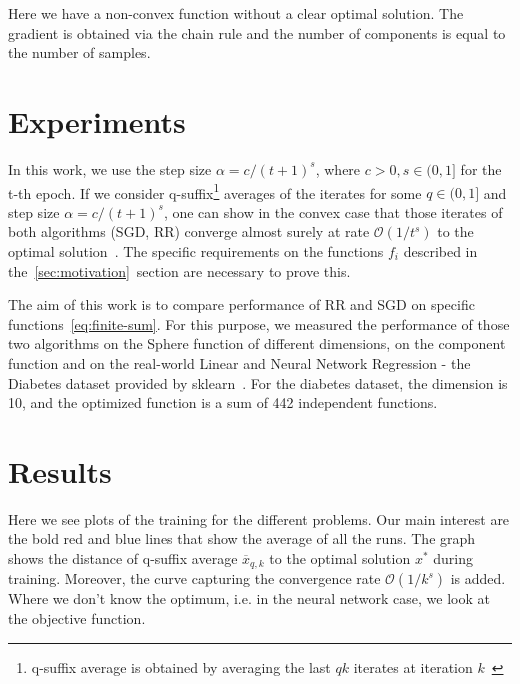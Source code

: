 \documentclass[10pt,conference,compsocconf]{IEEEtran}
\begin{document}
Here we have a non-convex function without a clear optimal solution. The gradient is obtained via the chain rule and the number of components is equal to the number of samples. 


\section{Experiments}


\medskip

In this work, we use the step size $\alpha = c / (t+1)^s$, where $c>0, s \in (0, 1]$ for the t-th epoch. If we consider q-suffix\footnote{q-suffix
average is obtained by averaging the last $qk$ iterates at iteration
$k$~\cite{COMPONENTFUNCTION}} averages of the iterates for some $q \in (0,1]$
and step size $\alpha = c / (t+1)^s$, one can show in the convex case that those iterates of both algorithms (SGD, RR) converge almost surely  at rate
$\mathcal{O}(1 / t^s)$ to the optimal solution~\cite{COMPONENTFUNCTION}.
The specific requirements on the functions $f_i$ described in
the~\ref{sec:motivation}~section are necessary to prove this.


The aim of this work is to compare performance of RR and SGD on
specific functions~\ref{eq:finite-sum}. For this purpose, we measured the
performance of those two algorithms on the Sphere function of different
dimensions, on the component function and on the real-world
Linear and Neural Network Regression - the Diabetes dataset provided by
sklearn~\cite{DIABETES,SKLEARN}. For the diabetes dataset, the dimension
is 10, and the optimized function is a sum of 442 independent functions.

\section{Results}
Here we see plots of the training for the different problems. Our main interest are the bold red and blue lines that show the average of all the runs. The graph shows the distance of q-suffix average $\overline{x}_{q,k}$ to the optimal solution $x^*$ during training. Moreover, the curve capturing the convergence rate $\mathcal{O}(1 / k^s)$ is added. Where we don't know the optimum, i.e. in the neural network case, we look at the objective function. 
\end{document}
